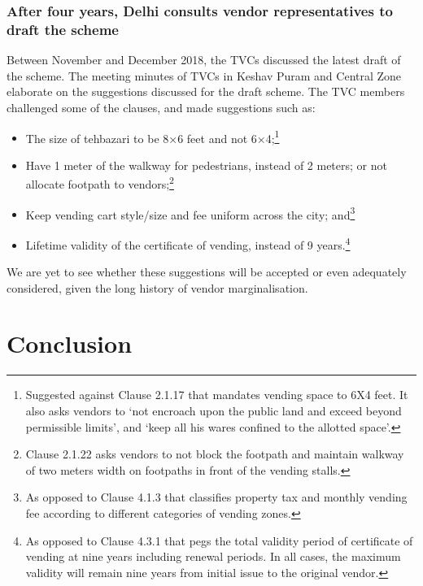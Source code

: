 \documentclass[a4paper, 12pt, twoside]{article}
\begin{document}
{{\subsubsection*{After four years, Delhi consults vendor representatives to draft the scheme}

Between November and December 2018, the TVCs discussed the latest draft of the scheme. The meeting minutes of TVCs in Keshav Puram and Central Zone elaborate on the suggestions discussed for the draft scheme. The TVC members challenged some of the clauses, and made suggestions such as: 
\begin{itemize}

\item The size of tehbazari to be 8×6 feet and not 6×4;\footnote{Suggested against Clause 2.1.17 that mandates vending space to 6X4 feet. It also asks vendors to `not encroach upon the public land and exceed beyond permissible limits', and `keep all his wares confined to the allotted space'. 
}
\item Have 1 meter of the walkway for pedestrians, instead of 2 meters; or not allocate footpath to vendors;\footnote{Clause 2.1.22 asks vendors to not block the footpath and maintain walkway of two meters width on footpaths in front of the vending stalls.
}
\item Keep vending cart style/size and fee uniform across the city; and\footnote{As opposed to Clause 4.1.3 that classifies property tax and monthly vending fee according to different categories of vending zones.
}
\item Lifetime validity of the certificate of vending, instead of 9 years.\footnote{As opposed to Clause 4.3.1 that pegs the total validity period of certificate of vending at nine years including renewal periods. In all cases, the maximum validity will remain nine years from initial issue to the original vendor. 
}
\end{itemize}
We are yet to see whether these suggestions will be accepted or even adequately considered, given the long history of vendor marginalisation.


\section*{Conclusion}

}}
\end{document}
